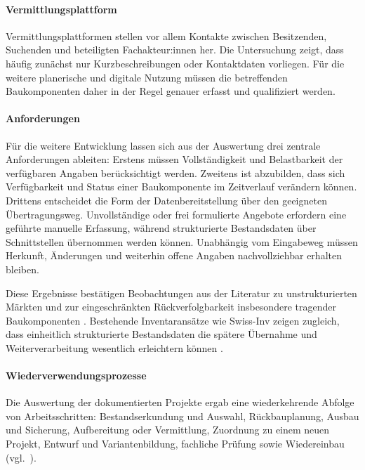 \documentclass[type=zwischenbericht,theme=dark]{zukunftbau}
\begin{document}
\begin{SemioNest}
\begin{SemioNest}
\paragraph{Vermittlungsplattform}
Vermittlungsplattformen stellen vor allem Kontakte zwischen Besitzenden, Suchenden und beteiligten Fachakteur:innen her. Die Untersuchung zeigt, dass häufig zunächst nur Kurzbeschreibungen oder Kontaktdaten vorliegen. Für die weitere planerische und digitale Nutzung müssen die betreffenden Baukomponenten daher in der Regel genauer erfasst und qualifiziert werden.

\paragraph{Anforderungen}
Für die weitere Entwicklung lassen sich aus der Auswertung drei zentrale Anforderungen ableiten: Erstens müssen Vollständigkeit und Belastbarkeit der verfügbaren Angaben berücksichtigt werden. Zweitens ist abzubilden, dass sich Verfügbarkeit und Status einer Baukomponente im Zeitverlauf verändern können. Drittens entscheidet die Form der Datenbereitstellung über den geeigneten Übertragungsweg. Unvollständige oder frei formulierte Angebote erfordern eine geführte manuelle Erfassung, während strukturierte Bestandsdaten über Schnittstellen übernommen werden können. Unabhängig vom Eingabeweg müssen Herkunft, Änderungen und weiterhin offene Angaben nachvollziehbar erhalten bleiben.

Diese Ergebnisse bestätigen Beobachtungen aus der Literatur zu unstrukturierten Märkten und zur eingeschränkten Rückverfolgbarkeit insbesondere tragender Baukomponenten \cite{densley-tingley-cooper-cullen-structural-steel-reuse-2017,sivers-fivet-reuse-market-dynamics-2025}. Bestehende Inventaransätze wie Swiss-Inv zeigen zugleich, dass einheitlich strukturierte Bestandsdaten die spätere Übernahme und Weiterverarbeitung wesentlich erleichtern können \cite{cirkla-swiss-inv}.
\end{SemioNest}

\paragraph{Wiederverwendungsprozesse}
Die Auswertung der dokumentierten Projekte ergab eine wiederkehrende Abfolge von Arbeitsschritten: Bestandserkundung und Auswahl, Rückbauplanung, Ausbau und Sicherung, Aufbereitung oder Vermittlung, Zuordnung zu einem neuen Projekt, Entwurf und Variantenbildung, fachliche Prüfung sowie Wiedereinbau (vgl.\ ).


\end{SemioNest}
\end{document}
